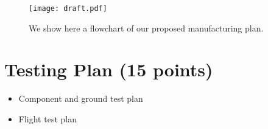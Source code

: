 \documentclass[proposal]{byu-aero}
\begin{document}
\begin{figure}[h!]
	\centering
	\texttt{[image: draft.pdf]}
	\caption{We show here a flowchart of our proposed manufacturing plan.}
	\label{fig:manufacturingplan}
\end{figure}

\section{Testing Plan (15 points)}
\label{sec:TestingPlan}
\begin{itemize}
    \item Component and ground test plan
    \item Flight test plan 
\end{itemize}


%
\end{document}
